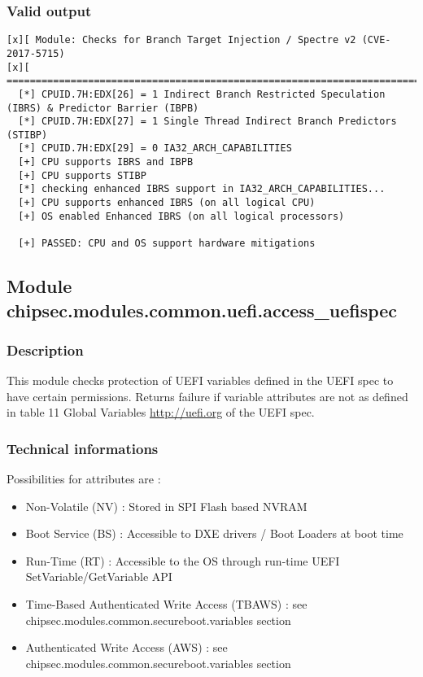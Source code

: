 \hypertarget{valid-output-17}{%
\subsubsection{Valid output}\label{valid-output-17}}

\begin{verbatim}
[x][ Module: Checks for Branch Target Injection / Spectre v2 (CVE-2017-5715)
[x][ =======================================================================
  [*] CPUID.7H:EDX[26] = 1 Indirect Branch Restricted Speculation (IBRS) & Predictor Barrier (IBPB)
  [*] CPUID.7H:EDX[27] = 1 Single Thread Indirect Branch Predictors (STIBP)
  [*] CPUID.7H:EDX[29] = 0 IA32_ARCH_CAPABILITIES
  [+] CPU supports IBRS and IBPB
  [+] CPU supports STIBP
  [*] checking enhanced IBRS support in IA32_ARCH_CAPABILITIES...
  [+] CPU supports enhanced IBRS (on all logical CPU)
  [+] OS enabled Enhanced IBRS (on all logical processors)

  [+] PASSED: CPU and OS support hardware mitigations
\end{verbatim}

\hypertarget{module-chipsec.modules.common.uefi.access_uefispec}{%
\subsection{Module
chipsec.modules.common.uefi.access\_uefispec}\label{module-chipsec.modules.common.uefi.access_uefispec}}

\hypertarget{description-18}{%
\subsubsection{Description}\label{description-18}}

This module checks protection of UEFI variables defined in the UEFI spec
to have certain permissions. Returns failure if variable attributes are
not as defined in table 11 Global Variables \url{http://uefi.org} of the
UEFI spec.

\hypertarget{technical-informations-17}{%
\subsubsection{Technical informations}\label{technical-informations-17}}

Possibilities for attributes are :

\begin{itemize}
\tightlist
\item
  Non-Volatile (NV) : Stored in SPI Flash based NVRAM
\item
  Boot Service (BS) : Accessible to DXE drivers / Boot Loaders at boot
  time
\item
  Run-Time (RT) : Accessible to the OS through run-time UEFI
  SetVariable/GetVariable API
\item
  Time-Based Authenticated Write Access (TBAWS) : see
  chipsec.modules.common.secureboot.variables section
\item
  Authenticated Write Access (AWS) : see
  chipsec.modules.common.secureboot.variables section
\end{itemize}

